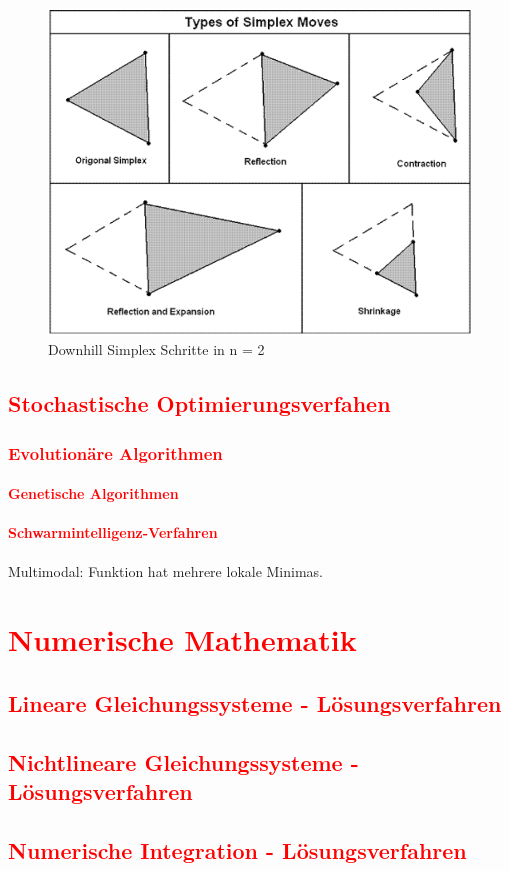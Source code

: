 					
					\begin{figure}[h]
						\centering
						\includegraphics[width=0.5\linewidth]{./pics/ma/DownhillSimpexSchritte}
						\caption{Downhill Simplex Schritte in n = 2}
						\label{fig:DownhillSimpexSchritte}
					\end{figure}
		\subsection{\textcolor{red}{Stochastische Optimierungsverfahen}}
			\subsubsection{\textcolor{red}{Evolutionäre Algorithmen}}
				\paragraph{\textcolor{red}{Genetische Algorithmen}}
				\paragraph{\textcolor{red}{Schwarmintelligenz-Verfahren}}
	Multimodal: Funktion hat mehrere lokale Minimas.
	

	
\section{\textcolor{red}{Numerische Mathematik}}
	\subsection{\textcolor{red}{Lineare Gleichungssysteme - Lösungsverfahren}}
	\subsection{\textcolor{red}{Nichtlineare Gleichungssysteme - Lösungsverfahren}}
	\subsection{\textcolor{red}{Numerische Integration - Lösungsverfahren}}
